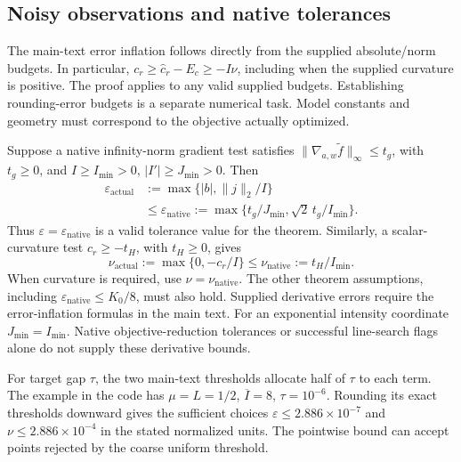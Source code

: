 \subsection{Noisy observations and native tolerances}
The main-text error inflation follows directly from the supplied absolute/norm budgets. In particular, $c_r\ge\widehat c_r-E_c\ge-I\nu$, including when the supplied curvature is positive. The proof applies to any valid supplied budgets. Establishing rounding-error budgets is a separate numerical task. Model constants and geometry must correspond to the objective actually optimized.

Suppose a native infinity-norm gradient test satisfies $\|\nabla_{a,w}\widetilde f\|_\infty\le t_g$, with $t_g\ge0$, and $I\ge I_{\min}>0$, $|I'|\ge J_{\min}>0$. Then
\begin{equation}
 \begin{aligned}
 \varepsilon_{\mathrm{actual}}&:=\max\{|b|,\|j\|_2/I\}\\
 &\le\varepsilon_{\mathrm{native}}
 :=\max\{t_g/J_{\min},\sqrt2\,t_g/I_{\min}\}.
 \end{aligned}
 \label{SI-eq:sstoprawconversion}
\end{equation}
Thus $\varepsilon=\varepsilon_{\mathrm{native}}$ is a valid tolerance value for the theorem. Similarly, a scalar-curvature test $c_r\ge-t_H$, with $t_H\ge0$, gives
\begin{equation*}
 \nu_{\mathrm{actual}}:=\max\{0,-c_r/I\}
 \le\nu_{\mathrm{native}}:=t_H/I_{\min}.
\end{equation*}
When curvature is required, use $\nu=\nu_{\mathrm{native}}$. The other theorem assumptions, including $\varepsilon_{\mathrm{native}}\le K_0/8$, must also hold. Supplied derivative errors require the error-inflation formulas in the main text. For an exponential intensity coordinate $J_{\min}=I_{\min}$. Native objective-reduction tolerances or successful line-search flags alone do not supply these derivative bounds.

For target gap $\tau$, the two main-text thresholds allocate half of $\tau$ to each term. The example in the code has $\mu=L=1/2$, $\overline I=8$, $\tau=10^{-6}$. Rounding its exact thresholds downward gives the sufficient choices $\varepsilon\le2.886\times10^{-7}$ and $\nu\le2.886\times10^{-4}$ in the stated normalized units. The pointwise bound can accept points rejected by the coarse uniform threshold.

